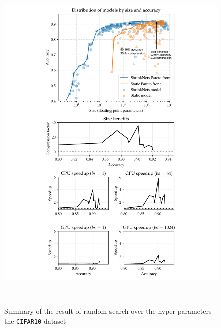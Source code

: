 \begin{figure}[tb]\centering
\begin{minipage}{2.7in}
\centering
\includegraphics[width=\columnwidth]{CIFAR10_VGG_summary-arrows}
\vspace*{-10mm}
\caption{\label{figure_CIFAR10} Summary of the result of random
search over the hyper-parameters the \texttt{CIFAR10} dataset}
\vspace*{-5mm}
\end{minipage}
\begin{minipage}{.3in}
~~
\end{minipage}
\begin{minipage}{2.7in}

\end{minipage}
\end{figure}
